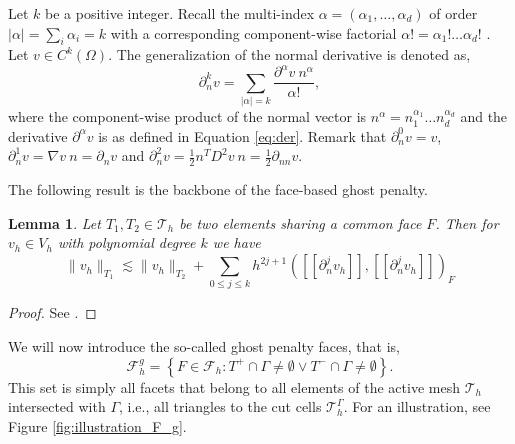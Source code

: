 \documentclass[11pt]{article}
\newtheorem{lemma}[theorem]{Lemma}
\theoremstyle{remark}
\newcommand{\jump}[1]{\left[\!\left[ #1 \right]\!\right]}
\newcommand{\abs}[1]{\left\lvert #1 \right\rvert}
\renewcommand{\le}{\leqslant}
\numberwithin{equation}{section}
\begin{document}
Let $k$ be a positive integer. Recall the multi-index $\alpha  = ( \alpha _{1}, \ldots, \alpha _{d})  $ of order $\abs{ \alpha  } = \sum_{i}^{}  \alpha _{i} = k $ with a corresponding component-wise factorial $\alpha ! = \alpha_{1}! \ldots \alpha _{d}!$ .
Let $  v \in C^{k}( \Omega ) $. The generalization of the normal derivative is denoted as,
\begin{equation}
    \partial _{n}^{k} v = \sum_{   \abs{ \alpha    } =  k}^{} \frac{ \partial^{\alpha } v \  n^{\alpha } }{\alpha !},
\end{equation}
where the component-wise product of the normal vector is $n^{\alpha } = n_{1}^{\alpha _{1}} \ldots n_{d}^{\alpha _{d}}$ and the derivative $\partial ^{\alpha }v $ is as defined in Equation \eqref{eq:der}. Remark that $\partial ^{0}_{n} v = v $, $ \partial ^{1}_{n} v = \nabla v
 \ n = \partial _{n}v $ and $ \partial ^{2}_{n} v = \frac{1}{2} n^{T} D^2 v \ n = \frac{1}{2} \partial _{nn} v$.

The following result is the backbone of the face-based ghost penalty.
\begin{lemma}
    \label{lemma:bi_local_facet_estimate}
    Let $T_{1},T_{2 } \in  \mathcal{T} _{h}$ be two elements sharing a common face $F$. Then for $v_{h} \in V_{h}$ with polynomial degree $k$  we have
    \begin{equation}
    \| v_{h} \|_{ T_{1} }^{  }  \lesssim \| v_{h} \|_{ T_{2} }^{  } + \sum_{0\le j\le k}  {h^{2j +1}}^{} ( \jump{ \partial _{n}^{j} v_{h} }, \jump{ \partial ^{j}_{n} v_{h} }    )_{F}
    \end{equation}

\end{lemma}
\begin{proof}
    See \cite[Lemma 2.19]{gurkan2019stabilized}.
\end{proof}

We will now introduce the so-called ghost penalty faces, that is, \[
\mathcal{F} ^{g}_{h} = \left\{ F\in \mathcal{F} _{h} : T^{+}\cap \Gamma \neq \emptyset  \vee T^{-}\cap \Gamma \neq \emptyset  \right\}.
\]
This set is simply all facets that belong to all elements of the active mesh $\mathcal{T} _{h}$  intersected with $\Gamma $, i.e., all triangles to the cut cells $\mathcal{T} ^{\Gamma }_{h}$. For an illustration, see Figure \ref{fig:illustration_F_g}.
\end{document}
